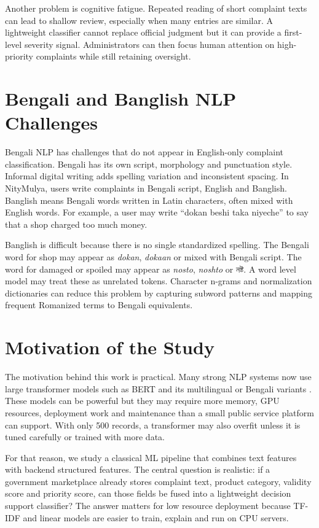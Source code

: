 \documentclass[12pt,a4paper,openany]{book}
\newcommand{\bn}[1]{{\banglafont #1}}
\newcommand{\bn}[1]{#1}
\begin{document}
Another problem is cognitive fatigue. Repeated reading of short complaint texts can lead to shallow review, especially when many entries are similar. A lightweight classifier cannot replace official judgment but it can provide a first-level severity signal. Administrators can then focus human attention on high-priority complaints while still retaining oversight.

\section{Bengali and Banglish NLP Challenges}
Bengali NLP has challenges that do not appear in English-only complaint classification. Bengali has its own script, morphology and punctuation style. Informal digital writing adds spelling variation and inconsistent spacing. In NityMulya, users write complaints in Bengali script, English and Banglish. Banglish means Bengali words written in Latin characters, often mixed with English words. For example, a user may write ``dokan beshi taka niyeche'' to say that a shop charged too much money.

Banglish is difficult because there is no single standardized spelling. The Bengali word for shop may appear as \textit{dokan}, \textit{dokaan} or mixed with Bengali script. The word for damaged or spoiled may appear as \textit{nosto}, \textit{noshto} or \bn{নষ্ট}. A word level model may treat these as unrelated tokens. Character n-grams and normalization dictionaries can reduce this problem by capturing subword patterns and mapping frequent Romanized terms to Bengali equivalents.

\section{Motivation of the Study}
The motivation behind this work is practical. Many strong NLP systems now use large transformer models such as BERT and its multilingual or Bengali variants \cite{devlin2019bert,bhattacharjee2022banglabert}. These models can be powerful but they may require more memory, GPU resources, deployment work and maintenance than a small public service platform can support. With only 500 records, a transformer may also overfit unless it is tuned carefully or trained with more data.

For that reason, we study a classical ML pipeline that combines text features with backend structured features. The central question is realistic: if a government marketplace already stores complaint text, product category, validity score and priority score, can those fields be fused into a lightweight decision support classifier? The answer matters for low resource deployment because TF-IDF and linear models are easier to train, explain and run on CPU servers.
\end{document}
